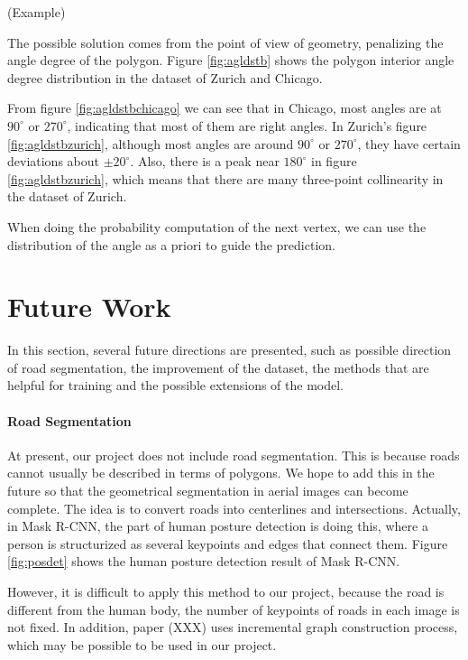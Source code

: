 (Example)

The possible solution comes from the point of view of geometry, penalizing the angle degree of the polygon. Figure \ref{fig:agldstb} shows the polygon interior angle degree distribution in the dataset of Zurich and Chicago.



From figure \ref{fig:agldstbchicago} we can see that in Chicago, most angles are at $90^\circ$ or $270^\circ$, indicating that most of them are right angles. In Zurich's figure \ref{fig:agldstbzurich}, although most angles are around $90^\circ$ or $270^\circ$, they have certain deviations about $\pm20^\circ$. Also, there is a peak near $180^\circ$ in figure \ref{fig:agldstbzurich}, which means that there are many three-point collinearity in the dataset of Zurich.

When doing the probability computation of the next vertex, we can use the distribution of the angle as a priori to guide the prediction.

\section{Future Work}\label{ftrwrk}

In this section, several future directions are presented, such as possible direction of road segmentation, the improvement of the dataset, the methods that are helpful for training and the possible extensions of the model.

\paragraph{Road Segmentation}
At present, our project does not include road segmentation. This is because roads cannot usually be described in terms of polygons. We hope to add this in the future so that the geometrical segmentation in aerial images can become complete. The idea is to convert roads into centerlines and intersections. Actually, in Mask R-CNN, the part of human posture detection is doing this, where a person is structurized as several keypoints and edges that connect them. Figure \ref{fig:posdet} shows the human posture detection result of Mask R-CNN.

However, it is difficult to apply this method to our project, because the road is different from the human body, the number of keypoints of roads in each image is not fixed. In addition, paper (XXX) uses incremental graph construction process, which may be possible to be used in our project.

